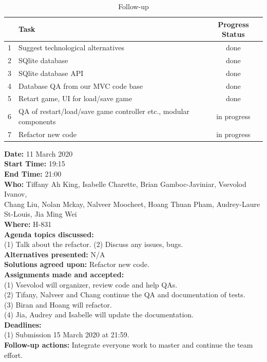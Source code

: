 \documentclass[12pt]{article}
\begin{document}
\begin{table}[h!]
\centering
 \begin{tabular}{||l l c ||} 
 \hline
   & Task & Progress Status\\ [0.5ex] 
 \hline\hline
 1 & Suggest technological alternatives & done \\
 2 & SQlite database & done\\
 3 & SQlite database API & done\\
 4 & Database QA from our MVC code base & done\\
 5 & Retart game, UI for load/save game & done\\
 6 & QA of restart/load/save game controller etc., modular components & in progress\\[1ex]
 7 & Refactor new code & in progress\\ 
 \hline
 \end{tabular}
\caption{Follow-up }
\label{table:1}
\end{table}

\newpage

{\bf Date:} 11 March 2020\\
{\bf Start Time:} 19:15\\
{\bf End Time:} 21:00\\
{\bf Who:} Tiffany Ah King, Isabelle Charette, Brian Gamboc-Javiniar, Vsevolod Ivanov,\\
Chang Liu, Nolan Mckay, Nalveer Moocheet, Hoang Thuan Pham, Audrey-Laure St-Louis, Jia Ming Wei\\
{\bf Where:} H-831\\
{\bf Agenda topics discussed:} \\
(1) Talk about the refactor.
(2) Discuss any issues, bugs.\\
{\bf Alternatives presented:} N/A\\
{\bf Solutions agreed upon:} Refactor new code.\\
{\bf Assignments made and accepted:} \\
(1) Vsevolod will organizer, review code and help QAs.\\
(2) Tifany, Nalveer and Chang continue the QA and documentation of tests.\\
(3) Biran and Hoang will refactor.\\
(4) Jia, Audrey and Isabelle will update the documentation.\\
{\bf Deadlines:} \\
(1) Submission 15 March 2020 at 21:59. \\
{\bf Follow-up actions:} Integrate everyone work to master and continue the team effort.\\
\end{document}
